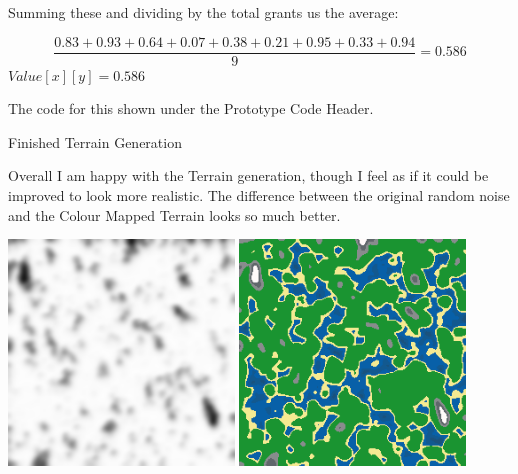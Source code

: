 \begin{flushleft}
\begin{enumerate}
\begin{center}
                Summing these and dividing by the total grants us the average:

                \[
                \frac{0.83 + 0.93 + 0.64 + 0.07 + 0.38 + 0.21 + 0.95 + 0.33 + 0.94}{9} = 0.586
                \]
                $Value[x][y] = 0.586$
            \end{center}
            \vspace{0.25cm}

            The code for this shown under the Prototype Code Header.

            \vspace{1cm}

            {\large Finished Terrain Generation} \\
            \vspace{0.25cm}

            Overall I am happy with the Terrain generation, though I feel as if it could be improved to look more realistic.
            The difference between the original random noise and the Colour Mapped Terrain looks so much better.

            \begin{center}
                \includegraphics[width=6cm]{Images/Prototype/Seed420 Grayscale.png}
                \includegraphics[width=6cm]{Images/Prototype/Seed420 Colour.png} 
            \end{center}
            

\end{enumerate}
\end{flushleft}
